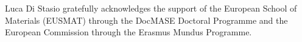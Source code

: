 \documentclass[smallextended]{svjour3}       %
\begin{document}
\begin{acknowledgements}
Luca Di Stasio gratefully acknowledges the support of the European School of Materials (EUSMAT) through the DocMASE Doctoral Programme and the European Commission through the Erasmus Mundus Programme.
\end{acknowledgements}


%
%



\end{document}
